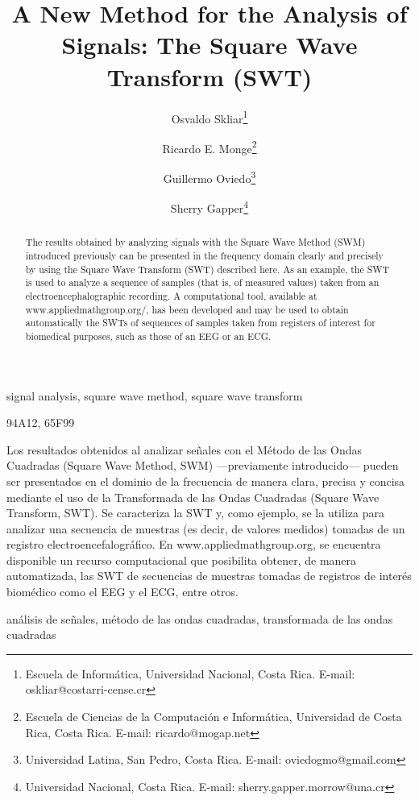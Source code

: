 \documentclass[11pt]{rMTA2010} \usepackage[utf8]{inputenc} \usepackage{graphicx} \usepackage{booktabs} \usepackage{array} \usepackage{enumerate}
\begin{document}
\title{A New Method for the Analysis of Signals: The Square Wave Transform (SWT)} \author{
Osvaldo Skliar\thanks{Escuela de Inform\'atica, Universidad Nacional, Costa Rica. E-mail: oskliar@costarri-cense.cr}
\and Ricardo E. Monge\thanks{Escuela de Ciencias de la Computaci\'on e Inform\'atica, Universidad de Costa Rica, Costa Rica. E-mail: ricardo@mogap.net}
\and Guillermo Oviedo\thanks{Universidad Latina, San Pedro, Costa Rica. E-mail: oviedogmo@gmail.com}
\and Sherry Gapper\thanks{Universidad Nacional, Costa Rica. E-mail: sherry.gapper.morrow@una.cr}}



\maketitle
\begin{abstract}
The results obtained by analyzing signals with the Square Wave Method (SWM) introduced previously can be presented in the frequency domain clearly and precisely by using the Square Wave Transform (SWT) described here. As an example, the SWT is used to analyze a sequence of samples (that is, of measured values) taken from an electroencephalographic recording. A computational tool, available at www.appliedmathgroup.org/, has been developed and may be used to obtain automatically the SWTs of sequences of samples taken from registers of interest for biomedical purposes, such as those of an EEG or an ECG.
\end{abstract}

\KW  signal analysis, square wave method, square wave transform

\AMS 94A12, 65F99

\newpage
\begin{resumen}
Los resultados obtenidos al analizar se\~nales con el M\'etodo de las Ondas Cuadradas (Square Wave Method, SWM) ---previamente introducido--- pueden ser presentados en el dominio de la frecuencia de manera clara, precisa y concisa mediante el uso de la Transformada de las Ondas Cuadradas (Square Wave Transform, SWT). Se caracteriza la SWT y, como ejemplo, se la utiliza para analizar una secuencia de muestras (es decir, de valores medidos) tomadas de un registro electroencefalogr\'afico. En www.appliedmathgroup.org, se encuentra disponible un recurso computacional que posibilita obtener, de manera automatizada, las SWT de secuencias de muestras tomadas de registros de inter\'es biom\'edico como el EEG y el ECG, entre otros.
\end{resumen}
\PC an\'alisis de se\~nales, m\'etodo de las ondas cuadradas, transformada de las ondas cuadradas
\end{document}
